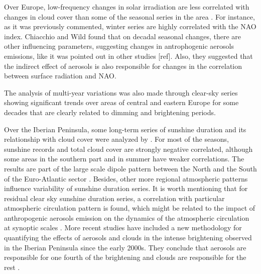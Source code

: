 
Over Europe, low-frequency changes in solar irradiation are less correlated with changes in cloud cover than some of the seasonal series in the area \cite*{Sanchez-Lorenzo2009, Chiacchio2010}. For instance, as it was previously commented, winter series are highly correlated with the NAO index. Chiacchio and Wild \cite*{Chiacchio2010} found that on decadal seasonal changes, there are other influencing parameters, suggesting changes in antrophogenic aerosols emissions, like it was pointed out in other studies [ref]. Also, they suggested that the indirect effect of aerosols is also responsible for changes in the correlation between surface radiation and NAO.

The analysis of multi-year variations was also made through clear-sky series showing significant trends over areas of central and eastern Europe for some decades that are clearly related to dimming and brightening periods.


Over the Iberian Peninsula, some long-term series of sunshine duration and its relationship with cloud cover were analyzed by \cite*{Sanchez-Lorenzo2009}. For most of the seasons, sunshine records and total cloud cover are strongly negative correlated, although some areas in the southern part and in summer have weaker correlations. The results are part of the large scale dipole pattern between the North and the South of the Euro-Atlantic sector \cite*{Pozo-Vazquez2004}. Besides, other more regional atmospheric patterns influence variability of sunshine duration series. It is worth mentioning that for residual clear sky sunshine duration series, a correlation with particular atmospheric circulation pattern is found, which might be related to the impact of anthropogenic aerosols emission on the dynamics of the atmospheric circulation at synoptic scales \cite{Sanchez-Lorenzo2009}. More recent studies have included a new methodology for quantifying the effects of aerosols and clouds in the intense brightening observed in the Iberian Peninsula since the early 2000s. They conclude that aerosols are responsible for one fourth of the brightening and clouds are responsible for the rest \cite*{Mateos2014}. %

